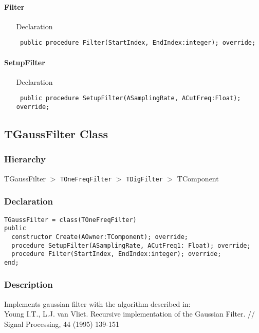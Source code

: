 \documentclass[12pt,a4paper,oneside]{report}
\newcommand{\declarationitem}[1]{{\addfontfeatures{FakeBold=1.3} #1}}
\newcommand{\code}[1]{\texttt{#1}}
\begin{document}
\paragraph{Filter}\hspace*{\fill}
\label{lmfilters.TMovAvFilter-Filter}
\begin{itemize}\item[\declarationitem{Declaration}\hfill]
	\begin{flushleft}
		\code{
			public procedure Filter(StartIndex, EndIndex:integer); override;}
	\end{flushleft}
\end{itemize}
\paragraph{SetupFilter}\hspace*{\fill}
\label{lmfilters.TMovAvFilter-SetupFilter}
\begin{itemize}\item[\declarationitem{Declaration}\hfill]
	\begin{flushleft}
		\code{
			public procedure SetupFilter(ASamplingRate, ACutFreq:Float); override;}
	\end{flushleft}
\end{itemize}
\subsection{TGaussFilter Class}
\label{lmfilters.TGaussFilter}
\subsubsection{Hierarchy}
TGaussFilter {$>$} \code{TOneFreqFilter} {$>$} \code{TDigFilter} {$>$} TComponent
\subsubsection{Declaration}
\begin{verbatim}
TGaussFilter = class(TOneFreqFilter)
public
  constructor Create(AOwner:TComponent); override;
  procedure SetupFilter(ASamplingRate, ACutFreq1: Float); override;
  procedure Filter(StartIndex, EndIndex:integer); override;
end;
\end{verbatim}
\subsubsection{Description}
Implements gaussian filter with the algorithm described in:\\
Young I.T., L.J. van Vliet. Recursive implementation of the Gaussian Filter. // Signal Processing, 44 (1995) 139-151
\end{document}
